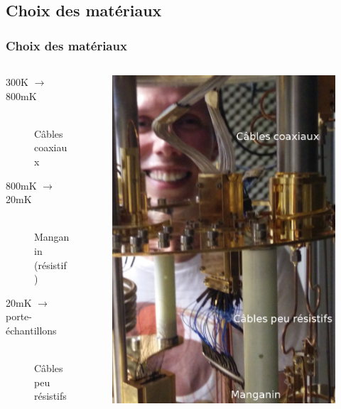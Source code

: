 \documentclass[10pt,a9paper,handout]{beamer} \usepackage[utf8]{inputenc} \usepackage[francais]{babel} \usepackage[T1]{fontenc}
\begin{document}
\subsection{Choix des matériaux}
\begin{frame}
\frametitle{Choix des matériaux}
\begin{columns}
\begin{column}{0.7\textwidth}
    \begin{description}
        \item[300K $\rightarrow$ 800mK]~\\
            Câbles coaxiaux
        \item[\hspace*{13.5mm}800mK $\rightarrow$ 20mK]~\\
            Manganin (résistif)
        \item[\hspace*{28.5mm} 20mK $\rightarrow$ porte-échantillons]~\\
            Câbles peu résistifs
    \end{description}
\end{column}
\begin{column}{0.3\textwidth}
\begin{figure}[h]
    \begin{center}
        \includegraphics[width=\textwidth]{Images/Thermalisation/Etage_Tuteur}

\end{center}
\end{figure}
\end{column}
\end{columns}
\end{frame}
\end{document}
